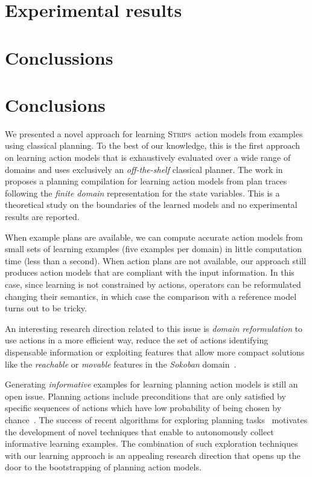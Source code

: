 \documentclass[runningheads]{llncs}
\newcommand{\strips}{\textsc{Strips}}     %
\begin{document}
\section{Experimental results}

\section{Conclussions}
\section{Conclusions}
We presented a novel approach for learning \strips\ action models from examples using classical planning. To the best of our knowledge, this is the first approach on learning action models that is exhaustively evaluated over a wide range of domains and uses exclusively an {\em off-the-shelf} classical planner. The work in~\cite{SternJ17} proposes a planning compilation for learning action models from plan traces following the {\em finite domain} representation for the state variables. This is a theoretical study on the boundaries of the learned models and no experimental results are reported.

When example plans are available, we can compute accurate action models from small sets of learning examples (five examples per domain) in little computation time (less than a second). When action plans are not available, our approach still produces action models that are compliant with the input information. In this case, since learning is not constrained by actions, operators can be reformulated changing their semantics, in which case the comparison with a reference model turns out to be tricky.

An interesting research direction related to this issue is {\em domain reformulation} to use actions in a more efficient way, reduce the set of actions identifying dispensable information or exploiting features that allow more compact solutions like the {\em reachable} or {\em movable} features in the {\em Sokoban} domain~\cite{haslum:axiomsoptimal:ijcai15}.

Generating {\em informative} examples for learning planning action models is still an open issue. Planning actions include preconditions that are only satisfied by specific sequences of actions which have low probability of being chosen by chance~\cite{fern2004learning}. The success of recent algorithms for exploring planning tasks~\cite{FrancesRLG17} motivates the development of novel techniques that enable to autonomously collect informative learning examples. The combination of such exploration techniques with our learning approach is an appealing research direction that opens up the door to the bootstrapping of planning action models.
\end{document}
